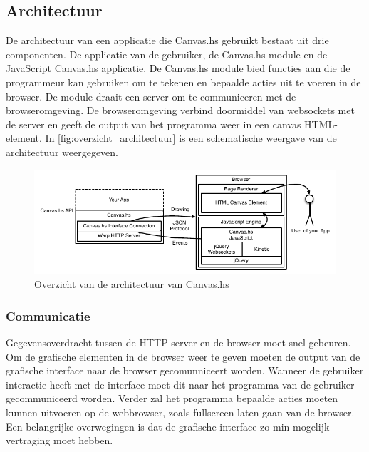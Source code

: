 \subsection{Architectuur}
De architectuur van een applicatie die Canvas.hs gebruikt bestaat uit drie componenten. De applicatie van de gebruiker, de Canvas.hs module en de JavaScript Canvas.hs applicatie. De Canvas.hs module bied functies aan die de programmeur kan gebruiken om te tekenen en bepaalde acties uit te voeren in de browser. De module draait een server om te communiceren met de browseromgeving. De browseromgeving verbind doormiddel van websockets met de server en geeft de output van het programma weer in een canvas HTML-element. In \autoref{fig:overzicht_architectuur} is een schematische weergave van de architectuur weergegeven.

\begin{figure}
\begin{center}
\includegraphics[keepaspectratio,width=\textwidth]{./images/architectuur_overzicht.pdf}
\caption{Overzicht van de architectuur van Canvas.hs}
\label{fig:overzicht_architectuur}
\end{center}
\end{figure}

\subsubsection{Communicatie}
Gegevensoverdracht tussen de HTTP server en de browser moet snel gebeuren. Om de grafische elementen in de browser weer te geven moeten de output van de grafische interface naar de browser gecomunniceert worden. Wanneer de gebruiker interactie heeft met de interface moet dit naar het programma van de gebruiker gecommuniceerd worden. Verder zal het programma bepaalde acties moeten kunnen uitvoeren op de webbrowser, zoals fullscreen laten gaan van de browser. Een belangrijke overwegingen is dat de grafische interface zo min mogelijk vertraging moet hebben.


